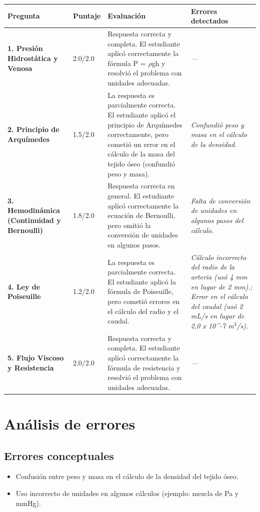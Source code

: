 \documentclass[11pt,a4paper]{article}
\begin{document}
\begin{longtable}{>{\bfseries}p{2.8cm} p{1.6cm} p{7.0cm} p{2.8cm}}
  \toprule
  \textbf{Pregunta} & \textbf{Puntaje} & \textbf{Evaluación} & \textbf{Errores detectados} \\
  \midrule
  \endhead
  \bottomrule
  \endfoot
    \textbf{1. Presión Hidrostática y Venosa} & 2.0/2.0 & Respuesta correcta y completa. El estudiante aplicó correctamente la fórmula P = $\rho$gh y resolvió el problema con unidades adecuadas. & \textit{---} \\
    \midrule
    \textbf{2. Principio de Arquímedes} & 1.5/2.0 & La respuesta es parcialmente correcta. El estudiante aplicó el principio de Arquímedes correctamente, pero cometió un error en el cálculo de la masa del tejido óseo (confundió peso y masa). & \textit{Confundió peso y masa en el cálculo de la densidad.} \\
    \midrule
    \textbf{3. Hemodinámica (Continuidad y Bernoulli)} & 1.8/2.0 & Respuesta correcta en general. El estudiante aplicó correctamente la ecuación de Bernoulli, pero omitió la conversión de unidades en algunos pasos. & \textit{Falta de conversión de unidades en algunos pasos del cálculo.} \\
    \midrule
    \textbf{4. Ley de Poiseuille} & 1.2/2.0 & La respuesta es parcialmente correcta. El estudiante aplicó la fórmula de Poiseuille, pero cometió errores en el cálculo del radio y el caudal. & \textit{Cálculo incorrecto del radio de la arteria (usó 4 mm en lugar de 2 mm).; Error en el cálculo del caudal (usó 2 mL/s en lugar de 2,0 x 10\textasciicircum{}-7 m$^{3}$/s).} \\
    \midrule
    \textbf{5. Flujo Viscoso y Resistencia} & 2.0/2.0 & Respuesta correcta y completa. El estudiante aplicó correctamente la fórmula de resistencia y resolvió el problema con unidades adecuadas. & \textit{---} \\
    \midrule
\end{longtable}

\section*{Análisis de errores}

\subsection*{Errores conceptuales}
\begin{itemize}[leftmargin=1.5em, itemsep=2pt]
  \item Confusión entre peso y masa en el cálculo de la densidad del tejido óseo.
  \item Uso incorrecto de unidades en algunos cálculos (ejemplo: mezcla de Pa y mmHg).
\end{itemize}
\end{document}
